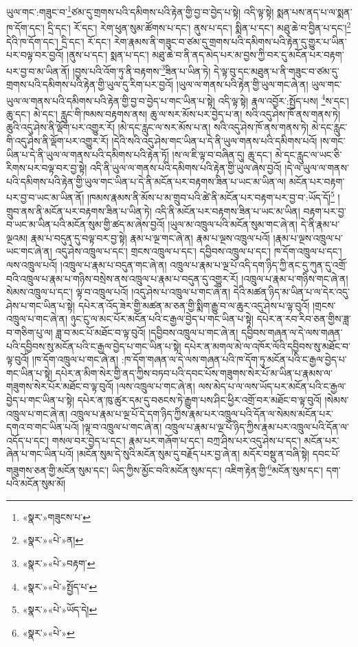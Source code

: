 ཡུལ་གང་:གཟུང་བ་\footnote{«སྣར་»གཟུངས་པ་}ཙམ་དུ་གྲགས་པའི་དམིགས་པའི་རྟེན་གྱི་བྱ་བ་བྱེད་པ་སྟེ། འདི་ལྟ་སྟེ། སྨན་པས་ནད་པ་ལ་སྨན་ཁ་དོག་དང་། དྲི་དང་། རོ་དང་། རེག་ཕུན་སུམ་ཚོགས་པ་དང་། ནུས་པ་དང་། སྨིན་པ་དང་། མཐུ་ཆེ་བ་བྱིན་པ་དང་།\footnote{«སྣར་»«པེ་»ན།} དེའི་ཁ་དོག་དང་། དྲི་དང་། རོ་དང་། རེག་རྣམས་ནི་གཟུང་བ་ཙམ་དུ་གྲགས་པའི་དམིགས་པའི་རྟེན་དུ་གྱུར་པ་ཡིན་པར་བལྟ་བར་བྱའོ། །ནུས་པ་དང་། སྨན་པ་དང་། མཐུ་ཆེ་བ་ནི་ནད་མེད་པར་མ་བྱས་ཀྱི་བར་དུ་མངོན་པར་བརྟག་པར་བྱ་བ་མ་ཡིན་ནོ། །བྱས་པའི་འོག་ཏུ་ནི་བརྟགས་\footnote{«སྣར་»«པེ་»བརྟག་}ཟིན་པ་ཡིན་ཏེ། དེ་ལྟ་བུ་དང་མཐུན་པ་ནི་གཟུང་བ་ཙམ་དུ་གྲགས་པའི་དམིགས་པའི་རྟེན་གྱི་ཡུལ་དུ་རིག་པར་བྱའོ། །ཡུལ་ལ་གནས་པའི་རྟེན་གྱི་ཡུལ་གང་ཞེ་ན། ཡུལ་གང་ཡུལ་ལ་གནས་པའི་དམིགས་པའི་རྟེན་གྱི་བྱ་བ་བྱེད་པ་གང་ཡིན་པ་སྟེ། འདི་ལྟ་སྟེ། རྣལ་འབྱོར་:སྤྱོད་པས། \footnote{«སྣར་»«པེ་»སྤྱོད་པ་}ས་དང་། ཆུ་དང་། མེ་དང་། རླུང་གི་ཁམས་བརྟགས་ནས། ཆུ་ལ་སར་མོས་པར་བྱེད་པ་ན། སའི་འདུ་ཤེས་ཁོ་ནས་གནས་ཏེ། ཆུའི་འདུ་ཤེས་ནི་ལྡོག་པར་འགྱུར་རོ། །མེ་དང་རླུང་ལ་སར་མོས་པ་ན། སའི་འདུ་ཤེས་ཁོ་ནས་གནས་ཏེ། མེ་དང་རླུང་གི་འདུ་ཤེས་ནི་ལྡོག་པར་འགྱུར་རོ། །དེའི་སའི་འདུ་ཤེས་གང་ཡིན་པ་དེ་ནི་ཡུལ་གནས་པའི་དམིགས་པའོ། །ས་གང་ཡིན་པ་དེ་ནི་ཡུལ་ལ་གནས་པའི་དམིགས་པའི་རྟེན་ཏོ། །ས་ལ་ཇི་ལྟ་བ་བཞིན་དུ། ཆུ་དང་། མེ་དང་རླུང་ལ་ཡང་ཅི་རིགས་པར་བལྟ་བར་བྱ་སྟེ། འདི་ནི་ཡུལ་ལ་གནས་པའི་དམིགས་པའི་རྟེན་གྱི་ཡུལ་ཞེས་བྱའོ། །དེ་ལ་ཡུལ་ལ་གནས་པའི་དམིགས་པའི་རྟེན་གྱི་ཡུལ་གང་ཡིན་པ་དེ་ནི་མངོན་པར་བརྟགས་ཟིན་པ་ཡང་མ་ཡིན་ལ། མངོན་པར་བརྟག་པར་བྱ་བ་ཡང་མ་ཡིན་ནོ། །ཁམས་རྣམས་ནི་མོས་པ་མ་གྲུབ་པའི་ཚེ་ནི་མངོན་པར་བརྟག་པར་བྱ་བ་:ཡོད་དོ།\footnote{«སྣར་»«པེ་»ཡོད་དེ།} །གྲུབ་ནས་ནི་མངོན་པར་བརྟགས་ཟིན་པ་ཡིན་ཏེ། འདི་ནི་མངོན་པར་བརྟགས་ཟིན་པ་ཡང་མ་ཡིན། བརྟག་པར་བྱ་བ་ཡང་མ་ཡིན་པའི་མངོན་སུམ་གྱི་ཚད་མ་ཞེས་བྱའོ། །ཡུལ་མ་འཁྲུལ་པའི་མངོན་སུམ་གང་ཞེ་ན། དེ་ནི་རྣམ་པ་ལྔའམ། རྣམ་པ་བདུན་དུ་བལྟ་བར་བྱ་སྟེ། རྣམ་པ་ལྔ་གང་ཞེ་ན། རྣམ་པ་ལྔས་འཁྲུལ་པའོ། །རྣམ་པ་ལྔས་འཁྲུལ་པ་ཡང་གང་ཞེ་ན། འདུ་ཤེས་འཁྲུལ་པ་དང་། གྲངས་འཁྲུལ་པ་དང་། དབྱིབས་འཁྲུལ་པ་དང་། ཁ་དོག་འཁྲུལ་པ་དང་། ལས་འཁྲུལ་པའོ། །འཁྲུལ་པ་རྣམ་པ་བདུན་གང་ཞེ་ན། འཁྲུལ་པ་རྣམ་པ་ལྔ་པོ་འདི་དག་ཉིད་ཀྱི་ནང་དུ་ཀུན་དུ་འགྲོ་བའི་འཁྲུལ་པ་རྣམ་པ་གཉིས་བསྲེས་ནས་འཁྲུལ་པ་རྣམ་པ་བདུན་དུ་འགྱུར་རོ། །འཁྲུལ་པ་རྣམ་པ་གཉིས་གང་ཞེ་ན། སེམས་འཁྲུལ་པ་དང་། ལྟ་བ་འཁྲུལ་པའོ། །འདུ་ཤེས་པ་འཁྲུལ་པ་གང་ཞེ་ན། དེའི་མཚན་ཉིད་མ་ཡིན་པ་ལ་དེར་འདུ་ཤེས་པ་གང་ཡིན་པ་སྟེ། དཔེར་ན་འོད་ཟེར་གྱི་མཚན་མ་ཅན་གྱི་སྨིག་རྒྱུ་བ་ལ་ཆུར་འདུ་ཤེས་པ་ལྟ་བུའོ། །གྲངས་འཁྲུལ་པ་གང་ཞེ་ན། ཉུང་ངུ་ལ་མང་པོར་མངོན་པའི་ང་རྒྱལ་བྱེད་པ་གང་ཡིན་པ་སྟེ། དཔེར་ན་རབ་རིབ་ཅན་གྱིས་ཟླ་བ་གཅིག་པུ་ལ། ཟླ་བ་མང་པོ་མཐོང་བ་ལྟ་བུའོ། །དབྱིབས་འཁྲུལ་པ་གང་ཞེ་ན། དབྱིབས་གཞན་ལ་དེ་ལས་གཞན་པའི་དབྱིབས་སུ་མངོན་པའི་ང་རྒྱལ་བྱེད་པ་གང་ཡིན་པ་སྟེ། དཔེར་ན་མགལ་མེ་ལ་འཁོར་ལོའི་དབྱིབས་སུ་མཐོང་བ་ལྟ་བུའོ། །ཁ་དོག་འཁྲུལ་པ་གང་ཞེ་ན། :ཁ་དོག་གཞན་ལ་དེ་ལས་གཞན་པའི་ཁ་དོག་ཏུ་མངོན་པའི་ང་རྒྱལ་བྱེད་པ་གང་ཡིན་པ་སྟེ། དཔེར་ན་མིག་སེར་གྱི་ནད་ཀྱིས་བཏབ་པའི་དབང་པོས་གཟུགས་སེར་པོ་མ་ཡིན་པ་རྣམས་ལ་གཟུགས་སེར་པོར་མཐོང་བ་ལྟ་བུའོ། །ལས་འཁྲུལ་པ་གང་ཞེ་ན། ལས་མེད་པ་ལ་ལས་ཡོད་པར་མངོན་པའི་ང་རྒྱལ་བྱེད་པ་གང་ཡིན་པ་སྟེ། དཔེར་ན་ཁུ་ཚུར་དམ་དུ་བཅངས་ཏེ་རྒྱུག་པས་ཤིང་ཕྱིར་འགྲོ་བར་མཐོང་བ་ལྟ་བུའོ། །སེམས་འཁྲུལ་པ་གང་ཞེ་ན། འཁྲུལ་པ་རྣམ་པ་ལྔ་པོ་དེ་དག་ཉིད་ཀྱིས་རྣམ་པར་འཁྲུལ་པའི་དོན་ལ་སེམས་མངོན་པར་དགའ་བ་གང་ཡིན་པའོ། །ལྟ་བ་འཁྲུལ་པ་གང་ཞེ་ན། འཁྲུལ་པ་རྣམ་པ་ལྔ་པོ་ཉིད་ཀྱིས་རྣམ་པར་འཁྲུལ་པའི་དོན་ལ་འདོད་པ་དང་། གསལ་བར་བྱེད་པ་དང་། རྣམ་པར་གཞོག་པ་དང་། བཀྲ་ཤིས་པར་འདུ་ཤེས་པ་དང་། མངོན་པར་ཞེན་པ་གང་ཡིན་པའོ། །མངོན་སུམ་དེ་སུའི་མངོན་སུམ་དུ་བརྗོད་པར་བྱ་ཞེ་ན། མདོར་བསྡུ་ན་བཞི་སྟེ། དབང་པོ་གཟུགས་ཅན་གྱི་མངོན་སུམ་དང་། ཡིད་ཀྱིས་མྱོང་བའི་མངོན་སུམ་དང་། འཇིག་རྟེན་གྱི་\footnote{«སྣར་»«པེ་»}མངོན་སུམ་དང་། དག་པའི་མངོན་སུམ་མོ། 